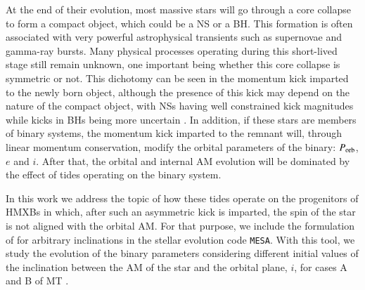 \documentclass{aa}
\begin{document}
At the end of their evolution, most massive stars will go through a core collapse to form a compact object, which could be a NS or a BH.
This formation is often associated with very powerful astrophysical transients such as supernovae and gamma-ray bursts. Many physical
processes operating during this short-lived stage still remain unknown, one important being whether this core collapse is symmetric or not.
This dichotomy can be seen in the momentum kick imparted to the newly born object, although the presence of this kick may depend on the
nature of the compact object, with  NSs having well constrained kick magnitudes \citep{hobbs2005} while kicks in BHs being more uncertain
\citep{brandt1995,willems2005,wong2012,wong2014,vanbeveren2020,callister2021,stevenson2022}. In addition, if these stars are members of
binary systems, the momentum kick imparted to the remnant will, through linear momentum conservation, modify the orbital parameters of the
binary: $P_{\rm orb}$, $e$ and $i$. After that, the  orbital and internal AM evolution will be dominated by the effect of tides operating
on the binary system.


In this work we address the topic of how these tides operate on the progenitors of HMXBs in which, after such an asymmetric kick is
imparted, the spin of the star is not aligned with the orbital AM. For that purpose, we include the formulation of \citet{repetto2014} for
arbitrary inclinations in the stellar evolution code {\tt MESA}. With this tool, we study the evolution of the binary parameters
considering different initial values of the inclination between the AM of the star and the orbital plane, $i$, for cases A and B of MT
\citep{kippenhahn1967}.
\end{document}
